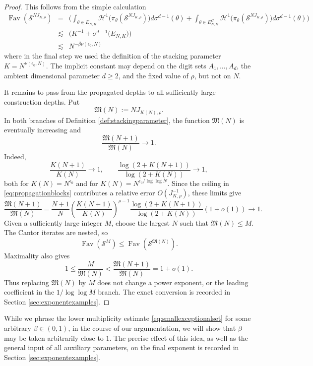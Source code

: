 \documentclass[12pt]{amsart}
\numberwithin{equation}{section}
\DeclareMathOperator{\Fav}{Fav}
\begin{document}
\begin{proof}
This follows from the simple calculation
\begin{eqnarray*}
    \Fav (\mathcal{S}^{NJ_{K,\rho}}) & = & \bigg(\int_{\theta \in E_{N,K}} \mathcal{H}^1 \big(\pi_{\theta}( \mathcal{S}^{NJ_{K,\rho}}) \big) d \sigma^{d-1}(\theta) + \int_{\theta\in E_{N,K}^C} \mathcal{H}^1 \big(\pi_{\theta} (\mathcal{S}^{NJ_{K,\rho}}) \big) d \sigma^{d-1} (\theta) \bigg) \\[1ex]
    \quad & \lesssim & \bigg(K^{-1} + \sigma^{d-1} \big(E_{N,K}\big)\bigg) \\[1ex]
    \quad & \lesssim &  N^{- \beta \nu(\epsilon_0, N)}
\end{eqnarray*}
where in the final step we used the definition of the stacking parameter
$K=N^{\nu(\epsilon_0,N)}$.  The implicit constant may depend on the digit sets $A_1,...,A_d$, the ambient dimensional parameter $d \geq 2$, and the fixed value of $\rho$, but not on $N$.

It remains to pass from the propagated depths to all sufficiently large
construction depths.  Put
\[
 \mathfrak M(N):=NJ_{K(N),\rho}.
\]
In both branches of Definition \ref{def:stackingparameter}, the function
$\mathfrak M(N)$ is eventually increasing and
\[
 \frac{\mathfrak M(N+1)}{\mathfrak M(N)}\longrightarrow1.
\]
Indeed,
\[
 \frac{K(N+1)}{K(N)}\longrightarrow1,
 \qquad
 \frac{\log(2+K(N+1))}{\log(2+K(N))}\longrightarrow1,
\]
both for $K(N)=N^{\epsilon_0}$ and for
$K(N)=N^{\epsilon_0/\log\log N}$.  Since the ceiling in
\eqref{eq:propagationblocks} contributes a relative error $O(J_{K,\rho}^{-1})$,
these limits give
\[
 \frac{\mathfrak M(N+1)}{\mathfrak M(N)}
 =\frac{N+1}{N}
 \left(\frac{K(N+1)}{K(N)}\right)^{\rho-1}
 \frac{\log(2+K(N+1))}{\log(2+K(N))}(1+o(1))
 \longrightarrow1.
\]
Given a sufficiently large integer $M$, choose the largest $N$ such that
$\mathfrak M(N)\leq M$.  The Cantor iterates are nested, so
\[
 \Fav(\mathcal S^M)\leq\Fav(\mathcal S^{\mathfrak M(N)}).
\]
Maximality also gives
\[
 1\leq\frac{M}{\mathfrak M(N)}
 <\frac{\mathfrak M(N+1)}{\mathfrak M(N)}=1+o(1).
\]
Thus replacing $\mathfrak M(N)$ by $M$ does not change a power exponent, or
the leading coefficient in the $1/\log\log M$ branch.  The exact conversion
is recorded in Section \ref{sec:exponentexamples}.
\end{proof}

While we phrase the lower multiplicity estimate \eqref{eq:smallexceptionalset} for some arbitrary $\beta \in (0,1)$, in the course of our argumentation, we will show that $\beta$ may be taken arbitrarily close to $1$.  The precise effect of this idea, as well as the general input of all auxiliary parameters, on the final exponent is recorded in Section \ref{sec:exponentexamples}.
\end{document}
